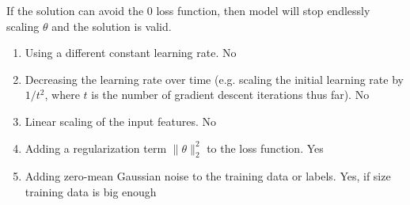\begin{answer}

If the solution can avoid the 0 loss function, then model will stop endlessly scaling $\theta$ and the solution is valid. 

\begin{enumerate}
    \item  Using a different constant learning rate. No
    \item Decreasing the learning rate over time (e.g. scaling the initial
    learning rate by $1/t^2$, where $t$ is the number of gradient descent
    iterations thus far). No
    \item Linear scaling of the input features. No
    \item Adding a regularization term $\|\theta\|_2^2$ to the loss function. Yes
    \item Adding zero-mean Gaussian noise to the training data or labels. Yes, if size training data is big enough
\end{enumerate}

\end{answer}
